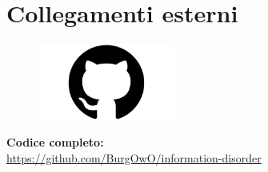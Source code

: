 \documentclass[12pt]{article}
\begin{document}
\section{Collegamenti esterni}
\begin{figure}[H]
	\centering
	\includegraphics[width=0.4\textwidth]{immagini/github}
\end{figure}
\begin{flushleft}
	\textbf{Codice completo:}\\
	\href{https://github.com/BurgOwO/information-disorder}{https://github.com/BurgOwO/information-disorder}
\end{flushleft}
	
\end{document}
